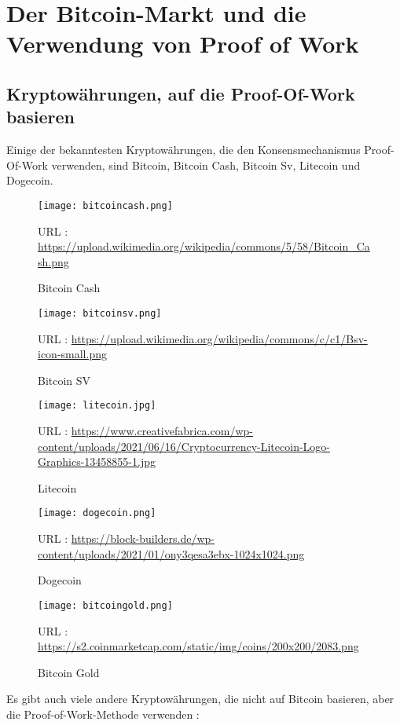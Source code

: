 \documentclass[ngerman]{scrreprt}
\begin{document}
\chapter{Der Bitcoin-Markt und die Verwendung von Proof of Work}
\section{Kryptowährungen, auf die Proof-Of-Work basieren}

	Einige der bekanntesten Kryptowährungen, die den Konsensmechanismus Proof-Of-Work verwenden, sind Bitcoin, Bitcoin Cash, Bitcoin Sv, Litecoin und Dogecoin. \\
		
	\begin{figure}[H]
		\centering
		\texttt{[image: bitcoincash.png]}
		\caption{Bitcoin Cash}
		\small URL : \url{https://upload.wikimedia.org/wikipedia/commons/5/58/Bitcoin_Cash.png}
	\end{figure} 
	\begin{figure}[H]
		\centering
		\texttt{[image: bitcoinsv.png]}
		\caption{Bitcoin SV}
		\small URL : \url{https://upload.wikimedia.org/wikipedia/commons/c/c1/Bsv-icon-small.png}
	\end{figure}
	\begin{figure}[H]
		\centering
		\texttt{[image: litecoin.jpg]}
		\caption{Litecoin}
		\small URL : \url{https://www.creativefabrica.com/wp-content/uploads/2021/06/16/Cryptocurrency-Litecoin-Logo-Graphics-13458855-1.jpg}
	\end{figure} 
	\begin{figure}[H]
		\centering
		\texttt{[image: dogecoin.png]}
		\caption{Dogecoin}
		\small URL : \url{https://block-builders.de/wp-content/uploads/2021/01/ony3qesa3ebx-1024x1024.png}
	\end{figure} 
	\begin{figure}[H]
		\centering
		\texttt{[image: bitcoingold.png]}
		\caption{Bitcoin Gold}
		\small URL : \url{https://s2.coinmarketcap.com/static/img/coins/200x200/2083.png}
	\end{figure} 

	Es gibt auch viele andere Kryptowährungen, die nicht auf Bitcoin basieren, aber die Proof-of-Work-Methode verwenden :
	
\end{document}
